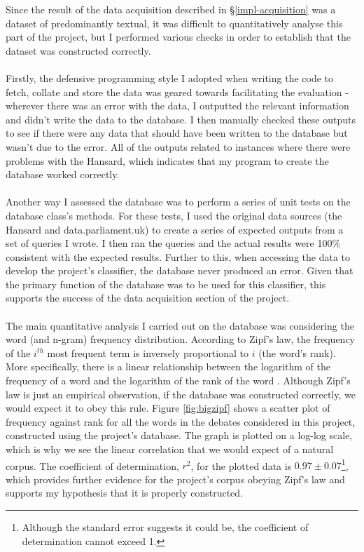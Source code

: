 \documentclass[12pt,a4paper,twoside,openright]{report}
\begin{document}
Since the result of the data acquisition described in \S\ref{impl-acquisition} was a dataset of predominantly textual, it was difficult to quantitatively analyse this part of the project, but I performed various checks in order to establish that the dataset was constructed correctly.
\\\\
Firstly, the defensive programming style I adopted when writing the code to fetch, collate and store the data was geared towards facilitating the evaluation - wherever there was an error with the data, I outputted the relevant information and didn't write the data to the database. I then manually checked these outputs to see if there were any data that should have been written to the database but wasn't due to the error. All of the outputs related to instances where there were problems with the Hansard, which indicates that my program to create the database worked correctly.
\\\\
Another way I assessed the database was to perform a series of unit tests on the database class's methods. For these tests, I used the original data sources (the Hansard and data.parliament.uk) to create a series of expected outputs from a set of queries I wrote. I then ran the queries and the actual results were 100\% consistent with the expected results. Further to this, when accessing the data to develop the project's classifier, the database never produced an error. Given that the primary function of the database was to be used for this classifier, this supports the success of the data acquisition section of the project.
\\\\
The main quantitative analysis I carried out on the database was considering the word (and n-gram) frequency distribution. According to Zipf's law, the frequency of the $i^{th}$ most frequent term is inversely proportional to $i$ (the word's rank). More specifically, there is a linear relationship between the logarithm of the frequency of a word and the logarithm of the rank of the word \cite{zipf}. Although Zipf's law is just an empirical observation, if the database was constructed correctly, we would expect it to obey this rule. Figure \ref{fig:bigzipf} shows a scatter plot of frequency against rank for all the words in the debates considered in this project, constructed using the project's database. The graph is plotted on a log-log scale, which is why we see the linear correlation that we would expect of a natural corpus. The coefficient of determination, $r^2$, for the plotted data is $0.97 \pm 0.07$\footnote{Although the standard error suggests it could be, the coefficient of determination cannot exceed 1.}, which provides further evidence for the project's corpus obeying Zipf's law and supports my hypothesis that it is properly constructed. 
\end{document}
